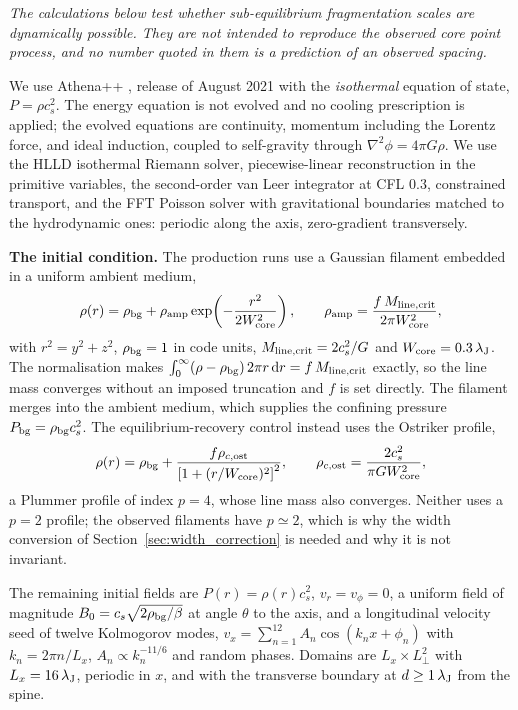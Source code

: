 \documentclass[usenatbib,twoside,twocolumn]{mnras}
\begin{document}
\smallskip\noindent\emph{The calculations below test whether sub-equilibrium fragmentation scales are dynamically possible. They are not intended to reproduce the observed core point process, and no number quoted in them is a prediction of an observed spacing.}

\smallskip We use Athena++ \citep{Stone2020}, release of August 2021 with the \emph{isothermal} equation of state, $P=\rho c_s^2$. The energy equation is not evolved and no cooling prescription is applied; the evolved equations are continuity, momentum including the Lorentz force, and ideal induction, coupled to self-gravity through $\nabla^2\phi=4\pi G\rho$. We use the HLLD isothermal Riemann solver, piecewise-linear reconstruction in the primitive variables, the second-order van Leer integrator at CFL $0.3$, constrained transport, and the FFT Poisson solver with gravitational boundaries matched to the hydrodynamic ones: periodic along the axis, zero-gradient transversely.

\smallskip\noindent\textbf{The initial condition.} The production runs use a Gaussian filament embedded in a uniform ambient medium,
\begin{equation}
\rho(r)=\rho_{\rm bg}+\rho_{\rm amp}\exp\!\left(-\frac{r^{2}}{2W_{\rm core}^{2}}\right),\qquad
\rho_{\rm amp}=\frac{f\,M_{\rm line,crit}}{2\pi W_{\rm core}^{2}},
\label{eq:ic_gauss}
\end{equation}
with $r^{2}=y^{2}+z^{2}$, $\rho_{\rm bg}=1$ in code units, $M_{\rm line,crit}=2c_s^{2}/G$ and $W_{\rm core}=0.3\,\lambda_{\rm J}$. The normalisation makes $\int_0^\infty(\rho-\rho_{\rm bg})\,2\pi r\,{\rm d}r=f\,M_{\rm line,crit}$ exactly, so the line mass converges without an imposed truncation and $f$ is set directly. The filament merges into the ambient medium, which supplies the confining pressure $P_{\rm bg}=\rho_{\rm bg}c_s^{2}$. The equilibrium-recovery control instead uses the Ostriker profile,
\begin{equation}
\rho(r)=\rho_{\rm bg}+\frac{f\rho_{c,\rm ost}}{\left[1+(r/W_{\rm core})^{2}\right]^{2}},\qquad
\rho_{c,\rm ost}=\frac{2c_s^{2}}{\pi G W_{\rm core}^{2}},
\label{eq:ic_ost}
\end{equation}
a Plummer profile of index $p=4$, whose line mass also converges. Neither uses a $p=2$ profile; the observed filaments have $p\simeq2$, which is why the width conversion of Section~\ref{sec:width_correction} is needed and why it is not invariant.

The remaining initial fields are $P(r)=\rho(r)c_s^{2}$, $v_r=v_\phi=0$, a uniform field of magnitude $B_0=c_s\sqrt{2\rho_{\rm bg}/\beta}$ at angle $\theta$ to the axis, and a longitudinal velocity seed of twelve Kolmogorov modes, $v_x=\sum_{n=1}^{12}A_n\cos(k_nx+\phi_n)$ with $k_n=2\pi n/L_x$, $A_n\propto k_n^{-11/6}$ and random phases. Domains are $L_x\times L_\perp^{2}$ with $L_x=16\,\lambda_{\rm J}$, periodic in $x$, and with the transverse boundary at $d\geq1\,\lambda_{\rm J}$ from the spine.
\end{document}
